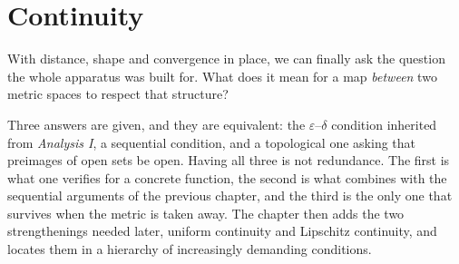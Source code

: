 \chapter{Continuity}
\label{ch:continuity}

With distance, shape and convergence in place, we can finally ask the question the whole
apparatus was built for. What does it mean for a map \emph{between} two metric spaces to respect
that structure?

Three answers are given, and they are equivalent: the $\varepsilon$--$\delta$ condition inherited
from \emph{Analysis I}, a sequential condition, and a topological one asking that preimages of
open sets be open. Having all three is not redundance. The first is what one verifies for a
concrete function, the second is what combines with the sequential arguments of the previous
chapter, and the third is the only one that survives when the metric is taken away. The chapter
then adds the two strengthenings needed later, uniform continuity and Lipschitz continuity, and
locates them in a hierarchy of increasingly demanding conditions.





